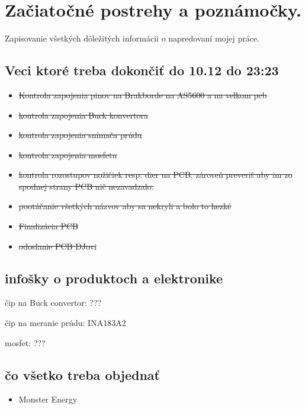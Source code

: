 \chapter{Začiatočné postrehy a poznámočky.}
\label{začiatok}


Zapisovanie všetkých dôležitých informácii o napredovaní mojej práce.


\section{Veci ktoré treba dokončiť do 10.12 do 23:23}

\begin{itemize}

\item \sout {Kontrola zapojenia pinov na Brakborde na AS5600 a na velkom pcb}
\item \sout {kontrola zapojenia Buck konvertora}
\item \sout {kontrola zapojenia snímača prúdu}
\item \sout {kontrola zapojenia mosfetu}
\item \sout {kontrola rozostupov nožičiek resp. dier na PCB, zároveň preveriť aby im zo spodnej strany PCB nič nezavadzalo.}
\item \sout {pootáčanie všetkých názvov aby sa nekryli a bolo to hezké}
\item \sout {Finalizácia PCB}
\item \sout {odoslanie PCB DJovi}
\end{itemize}

\section{infošky o produktoch a elektronike}

čip na Buck convertor: ??? \cite{BUCK2021}

čip na meranie prúdu: INA183A2 \cite{INA2021}

mosfet: ??? \cite{MOSFET2021}


\section{čo všetko treba objednať}

\begin{itemize}
\item Monster Energy
\end{itemize} 